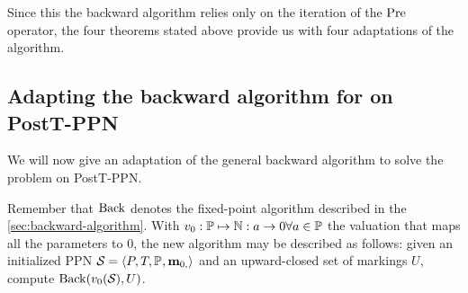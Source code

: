 %
%
%

Since this the backward algorithm relies only on the iteration of the $\operatorname{Pre}$ operator, the four theorems stated above provide us with four adaptations of the algorithm.

\subsection{Adapting the backward algorithm for \Ucov on PostT-\ac{PPN}}

We will now give an adaptation of the general backward algorithm to solve the \Ucov problem on PostT-\ac{PPN}.

Remember that $\operatorname{Back}$ denotes the fixed-point algorithm described in the \autoref{sec:backward-algorithm}.
With $v_0 : \mathbb{P} \mapsto \mathbb{N} : a \rightarrow 0 \forall a \in \mathbb{P}$ the valuation that maps all the parameters to 0, the new algorithm may be described as follows:
given an initialized \ac{PPN} $\mathcal{S}_{} = \left\langle P_{}, T_{}, \mathbb{P}_{}, \mathbf{m}_{0,}\right\rangle$ and an upward-closed set of markings $U$, compute $\operatorname{Back}(v_0(\mathcal{S}_{}), U)$.


